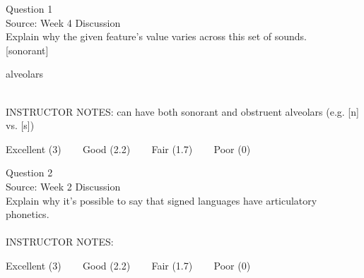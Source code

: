 \documentclass[12pt]{article}
\begin{document}
\begin{center}
\textbf{{\color{violet}{\HUGE 20201007 Wednesday\\}}}

\textbf{{\color{violet}{\HUGE ALL EXAMS (with notes)\\}}}

\end{center}
\newpage

\begin{center}
\textbf{{\color{blue}{\HUGE START OF EXAM\\}}}

\textbf{{\color{blue}{\HUGE Student ID: 23100\\}}}

\textbf{{\color{blue}{\HUGE 9:00\\}}}

\end{center}
\newpage

{\large Question 1}\\

Source: Week 4 Discussion\\

Explain why the given feature's value varies across this set of sounds.\\

{[sonorant]}

alveolars


~\\
INSTRUCTOR NOTES: can have both sonorant and obstruent alveolars (e.g. [n] vs. [s])


\vfill
Excellent (3) ~~~ Good (2.2) ~~~ Fair (1.7) ~~~ Poor (0)
\newpage

{\large Question 2}\\

Source: Week 2 Discussion\\

Explain why it's possible to say that signed languages have articulatory phonetics.\\


~\\
INSTRUCTOR NOTES: 


\vfill
Excellent (3) ~~~ Good (2.2) ~~~ Fair (1.7) ~~~ Poor (0)
\newpage

\begin{center}
\textbf{{\color{red}{\HUGE END OF EXAM}}}\\

\end{center}
\newpage
\end{document}
